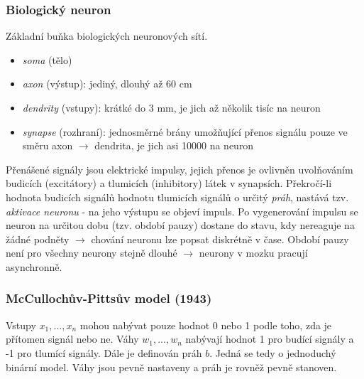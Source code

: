 \subsubsection*{Biologický neuron}
Základní buňka biologických neuronových sítí.
\begin{itemize}
\item \textit{soma} (tělo)
\item \textit{axon} (výstup): jediný, dlouhý až 60 cm
\item \textit{dendrity} (vstupy): krátké do 3 mm, je jich až několik tisíc na neuron
\item \textit{synapse} (rozhraní): jednosměrné brány umožňující přenos signálu pouze ve směru axon $ \to $ dendrita, je jich asi 10000 na neuron
\end{itemize}
Přenášené signály jsou elektrické impulsy, jejich přenos je ovlivněn uvolňováním budicích (excitátory) a tlumicích (inhibitory) látek v synapsích. Překročí-li hodnota budicích signálů hodnotu tlumicích signálů o určitý \textit{práh}, nastává tzv. \textit{aktivace neuronu} - na jeho výstupu se objeví impuls. Po vygenerování impulsu se neuron na určitou dobu (tzv. období pauzy) dostane do stavu, kdy nereaguje na žádné podněty $ \to $ chování neuronu lze popsat diskrétně v čase. Období pauzy není pro všechny neurony stejně dlouhé $ \to $ neurony v mozku pracují asynchronně.

\subsubsection*{McCullochův-Pittsův model (1943)}
Vstupy $ x_1,...,x_n $ mohou nabývat pouze hodnot 0 nebo 1 podle toho, zda je přítomen signál nebo ne. Váhy $ w_1,...,w_n $ nabývají hodnot 1 pro budící signály a -1 pro tlumící signály. Dále je definován práh $ b $. Jedná se tedy o jednoduchý binární model. Váhy jsou pevně nastaveny a práh je rovněž pevně stanoven.

